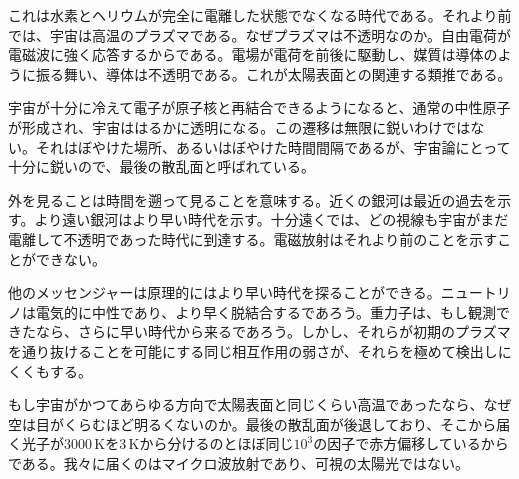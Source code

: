 これは水素とヘリウムが完全に電離した状態でなくなる時代である。それより前では、宇宙は高温のプラズマである。なぜプラズマは不透明なのか。自由電荷が電磁波に強く応答するからである。電場が電荷を前後に駆動し、媒質は導体のように振る舞い、導体は不透明である。これが太陽表面との関連する類推である。

宇宙が十分に冷えて電子が原子核と再結合できるようになると、通常の中性原子が形成され、宇宙ははるかに透明になる。この遷移は無限に鋭いわけではない。それはぼやけた場所、あるいはぼやけた時間間隔であるが、宇宙論にとって十分に鋭いので、最後の散乱面と呼ばれている。

外を見ることは時間を遡って見ることを意味する。近くの銀河は最近の過去を示す。より遠い銀河はより早い時代を示す。十分遠くでは、どの視線も宇宙がまだ電離して不透明であった時代に到達する。電磁放射はそれより前のことを示すことができない。

他のメッセンジャーは原理的にはより早い時代を探ることができる。ニュートリノは電気的に中性であり、より早く脱結合するであろう。重力子は、もし観測できたなら、さらに早い時代から来るであろう。しかし、それらが初期のプラズマを通り抜けることを可能にする同じ相互作用の弱さが、それらを極めて検出しにくくもする。

もし宇宙がかつてあらゆる方向で太陽表面と同じくらい高温であったなら、なぜ空は目がくらむほど明るくないのか。最後の散乱面が後退しており、そこから届く光子が\(3000\,\mathrm K\)を\(3\,\mathrm K\)から分けるのとほぼ同じ\(10^3\)の因子で赤方偏移しているからである。我々に届くのはマイクロ波放射であり、可視の太陽光ではない。

\begin{classroomqa}
\end{classroomqa}

\begin{classroomqa}
\end{classroomqa}


